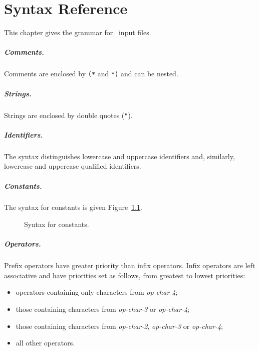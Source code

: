\chapter{Syntax Reference}
\label{chap:syntaxref}

This chapter gives the grammar for \why\ input files.


\paragraph{Comments.}
Comments are enclosed by \texttt{(*} and \texttt{*)} and can be nested.

\paragraph{Strings.}
Strings are enclosed by double quotes (\verb!"!).


\paragraph{Identifiers.} The syntax distinguishes lowercase and
uppercase identifiers and, similarly, lowercase and uppercase
qualified identifiers.
 
\begin{center}\framebox{}\end{center}

\paragraph{Constants.}
The syntax for constants is given Figure~\ref{fig:bnf:constant}.

\begin{figure}[p]
\begin{center}\framebox{}\end{center}
  \caption{Syntax for constants.}
\label{fig:bnf:constant}
\end{figure}

\paragraph{Operators.} Prefix operators have greater priority than
infix operators. Infix operators are left associative and have
priorities set as follows, from greatest to lowest priorities:
\begin{itemize}
\item operators containing only characters from
\textit{op-char-4};
\item those containing
 characters from \textit{op-char-3} or \textit{op-char-4};
\item those containing
 characters from \textit{op-char-2}, \textit{op-char-3} or
 \textit{op-char-4}; 
\item all other operators.
\end{itemize}

